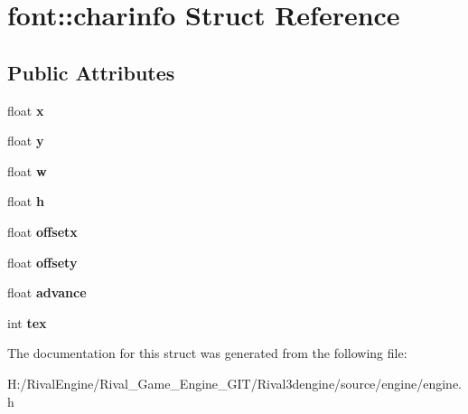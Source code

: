 \hypertarget{structfont_1_1charinfo}{}\section{font\+:\+:charinfo Struct Reference}
\label{structfont_1_1charinfo}
\subsection*{Public Attributes}
\begin{DoxyCompactItemize}
\item 
\mbox{\label{structfont_1_1charinfo_affeb82a6d448653651d168ac95890bce}} 
float {\bfseries x}
\item 
\mbox{\label{structfont_1_1charinfo_abc24e4b85db76f34106e0e5d1832ed24}} 
float {\bfseries y}
\item 
\mbox{\label{structfont_1_1charinfo_a04dfa419b5cd8bd7876cec9bfd26960d}} 
float {\bfseries w}
\item 
\mbox{\label{structfont_1_1charinfo_ae2899236760538631bbf588e4ff709a8}} 
float {\bfseries h}
\item 
\mbox{\label{structfont_1_1charinfo_a7085c272e4d392ccd3f2db1ad630227c}} 
float {\bfseries offsetx}
\item 
\mbox{\label{structfont_1_1charinfo_a0fdb15a9d57542a26501a2aeea22f715}} 
float {\bfseries offsety}
\item 
\mbox{\label{structfont_1_1charinfo_acd5b080d0f748c6487e86bc9b04ad7b7}} 
float {\bfseries advance}
\item 
\mbox{\label{structfont_1_1charinfo_abec765b564ddd1e50948b0408c2d54fc}} 
int {\bfseries tex}
\end{DoxyCompactItemize}


The documentation for this struct was generated from the following file\+:\begin{DoxyCompactItemize}
\item 
H\+:/\+Rival\+Engine/\+Rival\+\_\+\+Game\+\_\+\+Engine\+\_\+\+G\+I\+T/\+Rival3dengine/source/engine/engine.\+h\end{DoxyCompactItemize}
